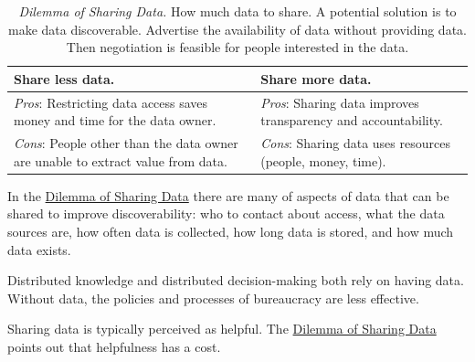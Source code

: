\begin{center}
\begin{table}[H] %
\begin{tabular}{ | m{\dilemmatablewidth}| m{\dilemmatablewidth} | } 
  \hline
  \textbf{Share less data.} &
  \textbf{Share more data.} \\
  \hline
  \textit{Pros}: Restricting data access saves money and time for the data owner.&
  \textit{Pros}: Sharing data improves transparency and accountability. \\
  \hline
  \textit{Cons}: People other than the data owner are unable to extract value from data. & 
  \textit{Cons}: Sharing data uses resources (people, money, time). \\
  \hline
\end{tabular}
\caption{
\textit{Dilemma of Sharing Data.}
How much data to share. A potential solution is to make data discoverable. Advertise the availability of data without providing data. Then negotiation is feasible for people interested in the data.
}
\label{table:dilemma-data-share-vs-hide}
\end{table}
\end{center}

In the \hyperref[table:dilemma-data-share-vs-hide]{Dilemma of Sharing Data} 
\iftoggle{printedonpaper}{ (\ref{table:dilemma-data-share-vs-hide}) }{}%
there are many of aspects of data that can be 
shared to improve discoverability: who to contact about access, what the data sources are, how often data is collected, how long data is stored, and how much data exists.

Distributed knowledge and distributed decision-making both rely on having data. Without data, the policies and processes of bureaucracy are less effective. 

Sharing data is typically perceived as helpful. 
The \hyperref[table:dilemma-data-share-vs-hide]{Dilemma of Sharing Data} 
\iftoggle{printedonpaper}{ (\ref{table:dilemma-data-share-vs-hide}) }{}%
points out that helpfulness has a cost. 

